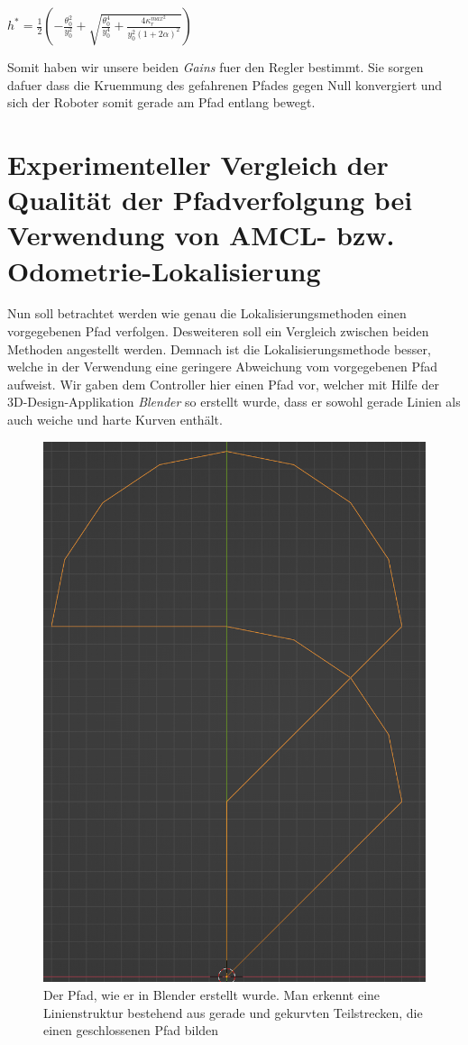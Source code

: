 \documentclass[11pt,a4paper]{article}
\begin{document}
$h^* = \frac{1}{2}(-\frac{\theta_0^2}{y_0^2}+\sqrt{\frac{\theta_0^4}{y_0^4}+\frac{4\kappa_r^{max^2}}{y_0^2(1+2\alpha)^2}})$

Somit haben wir unsere beiden \textit{Gains} fuer den Regler bestimmt. Sie sorgen dafuer dass die Kruemmung des gefahrenen Pfades gegen Null konvergiert und sich der Roboter 
somit gerade am Pfad entlang bewegt. 



\section{Experimenteller Vergleich der Qualität der Pfadverfolgung bei Verwendung von AMCL-  bzw. Odometrie-Lokalisierung}
Nun soll betrachtet werden wie genau die Lokalisierungsmethoden einen vorgegebenen Pfad verfolgen. Desweiteren soll ein Vergleich zwischen beiden Methoden angestellt werden. 
Demnach ist die Lokalisierungsmethode besser, welche in der Verwendung eine geringere Abweichung vom vorgegebenen Pfad aufweist. 
Wir gaben dem Controller hier einen Pfad vor, welcher mit Hilfe der 3D-Design-Applikation \textit{Blender} so erstellt wurde, dass er sowohl
gerade Linien als auch weiche und harte Kurven enthält.

\begin{figure}[ht]
\centering
\includegraphics[scale = 0.6]{pfadgrafik.png}
\caption{Der Pfad, wie er in Blender erstellt wurde. Man erkennt eine Linienstruktur bestehend aus gerade und gekurvten Teilstrecken, die einen geschlossenen Pfad bilden}
\label{fig: MessungExperiment}
\end{figure}
\end{document}
